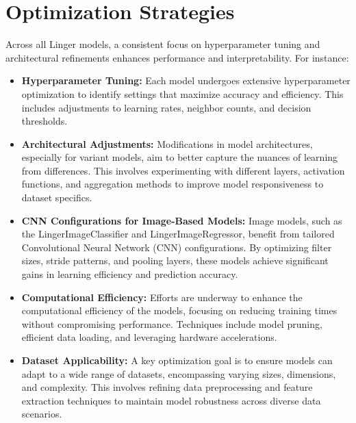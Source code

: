 \documentclass[a4paper, 12pt]{report}
\begin{document}
\section{Optimization Strategies}
\label{sec:optimization_strategies}
Across all Linger models, a consistent focus on hyperparameter tuning and architectural refinements enhances performance and interpretability. 
For instance:
\begin{itemize}
    \item \textbf{Hyperparameter Tuning:} Each model undergoes extensive hyperparameter optimization to identify settings that 
    maximize accuracy and efficiency. This includes adjustments to learning rates, neighbor counts, and decision thresholds.
    \item \textbf{Architectural Adjustments:} Modifications in model architectures, especially for variant models, aim to better capture 
    the nuances of learning from differences. This involves experimenting with different layers, activation functions, and 
    aggregation methods to improve model responsiveness to dataset specifics.
    \item \textbf{CNN Configurations for Image-Based Models:} Image models, such as the LingerImageClassifier and LingerImageRegressor, 
    benefit from tailored Convolutional Neural Network (CNN) configurations. By optimizing filter sizes, stride patterns, 
    and pooling layers, these models achieve significant gains in learning efficiency and prediction accuracy.
    \item \textbf{Computational Efficiency:} Efforts are underway to enhance the computational efficiency of the models, focusing on 
    reducing training times without compromising performance. Techniques include model pruning, efficient data loading, and leveraging 
    hardware accelerations.
    \item \textbf{Dataset Applicability:} A key optimization goal is to ensure models can adapt to a wide range of datasets, encompassing 
    varying sizes, dimensions, and complexity. This involves refining data preprocessing and feature extraction techniques to maintain model 
    robustness across diverse data scenarios.
\end{itemize}
\end{document}
